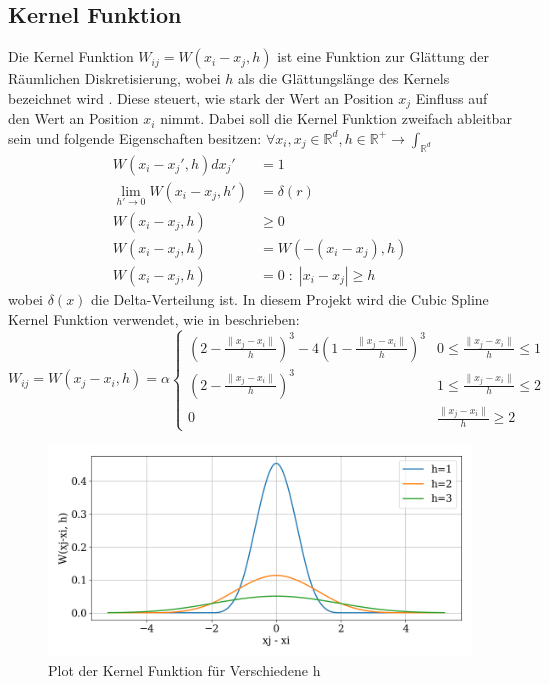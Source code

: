 \documentclass[a4paper, 12pt]{article}
\begin{document}
\subsection{Kernel Funktion}
Die Kernel Funktion \(W_{ij} = W(x_i - x_j, h)\) ist eine Funktion zur Glättung der Räumlichen Diskretisierung, wobei \(h\) als die Glättungslänge des Kernels bezeichnet wird \cite{10.1111:cgf.14508}. Diese steuert, wie stark der Wert an Position \(x_j\) Einfluss auf den Wert an Position \(x_i\) nimmt. Dabei soll die Kernel Funktion zweifach ableitbar sein und folgende Eigenschaften besitzen: \(\forall x_i, x_j \in \mathds{R}^d, h\in \mathds{R}^+ \rightarrow \int_{\mathds{R}^d}\)
\begin{align}
	W(x_i - x_j', h) dx_j' &= 1 \label{kernelEigenschaft1}\\
	\lim_{h'\rightarrow 0} W(x_i - x_j, h') &= \delta(r) \label{kernelEigenschaft2}\\
	W(x_i - x_j, h) &\geq 0 \label{kernelEigenschaft3}\\
	W(x_i - x_j, h) &= W(-(x_i - x_j), h) \label{kernelEigenschaft4}\\
	W(x_i - x_j, h) &= 0\;:\; |x_i - x_j| \geq h \label{kernelEigenschaft5}
\end{align}
wobei \(\delta(x)\) die Delta-Verteilung ist. 
In diesem Projekt wird die Cubic Spline Kernel Funktion verwendet, wie in \cite{professor_presentation_2024} beschrieben:
\begin{equation*}
	W_{ij} = W(x_j - x_i, h) = \alpha \begin{cases} 
	(2-\frac{\|x_j - x_i\|}{h})^3 - 4(1-\frac{\|x_j - x_i\|}{h})^3 & 0 \leq \frac{\|x_j - x_i\|}{h} \leq 1\\
	(2-\frac{\|x_j - x_i\|}{h})^3 & 1 \leq \frac{\|x_j - x_i\|}{h} \leq 2 \\
	0 & \frac{\|x_j - x_i\|}{h} \geq 2 
	\end{cases}
\end{equation*}

\begin{figure}[H]
	\centering
	\includegraphics[width=\textwidth]{graphics/KernelPlot.png}
	\caption{Plot der Kernel Funktion für Verschiedene h}
\end{figure}
\end{document}
